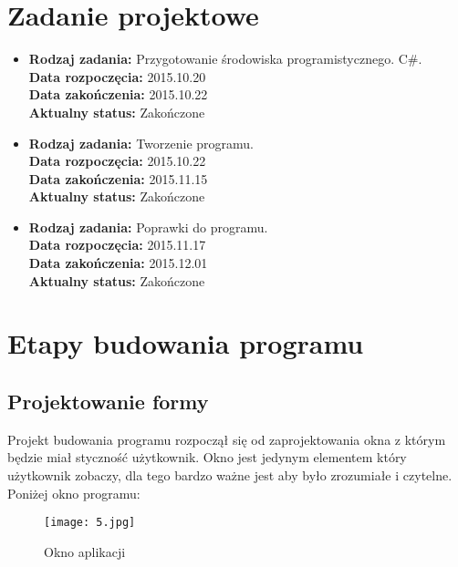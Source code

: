 
\section{Zadanie projektowe}			
\begin{itemize}	
	\item  
	\textbf{Rodzaj zadania:}   \hspace{1.5cm}  Przygotowanie środowiska programistycznego. C\#. \\
	\textbf{Data rozpoczęcia:} \hspace{1.0cm} 2015.10.20\\
	\textbf{Data zakończenia:} \hspace{0.95cm} 2015.10.22\\
	\textbf{Aktualny status:}  \hspace{1.25cm}  Zakończone\\
	
	\item  
	\textbf{Rodzaj zadania:}   \hspace{1.3cm}  Tworzenie programu. \\
	\textbf{Data rozpoczęcia:} \hspace{1.0cm} 2015.10.22\\
	\textbf{Data zakończenia:} \hspace{0.95cm} 2015.11.15\\
	\textbf{Aktualny status:}  \hspace{1.25cm}  Zakończone\\
	
		\item  
		\textbf{Rodzaj zadania:}   \hspace{1.3cm}  Poprawki do programu. \\
		\textbf{Data rozpoczęcia:} \hspace{1.0cm} 2015.11.17\\
		\textbf{Data zakończenia:} \hspace{0.95cm} 2015.12.01\\
		\textbf{Aktualny status:}  \hspace{1.25cm}  Zakończone\\
\end{itemize}

\section{Etapy budowania programu}
		
\subsection{Projektowanie formy}
Projekt budowania programu rozpoczął się od zaprojektowania okna z którym będzie miał styczność użytkownik. Okno jest jedynym elementem który użytkownik zobaczy, dla tego bardzo ważne jest aby było zrozumiałe i czytelne.\\
Poniżej okno programu:\\	
\begin{figure}
	\centering
	\texttt{[image: 5.jpg]}
	\caption{Okno aplikacji}
\end{figure} 

